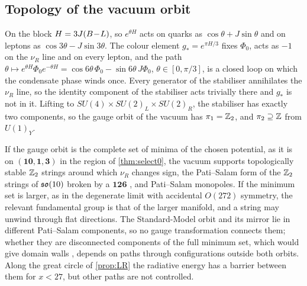 \subsection{Topology of the vacuum orbit}

\begin{theorem}[$\Z_2$ strings]
\label{thm:strings}
On the block $H=3J(B\!-\!L)$, so $e^{\theta H}$ acts on quarks as $\cos\theta+J\sin\theta$ and on leptons as $\cos3\theta-J\sin3\theta$. The colour element $g_*=e^{\pi H/3}$ fixes
$\Phi_0$, acts as $-1$ on the $\nu_R$ line and on every lepton, and the path $\theta\mapsto e^{\theta H}\Phi_0e^{-\theta H}=\cos6\theta\,\Phi_0-\sin6\theta\,J\Phi_0$,
$\theta\in[0,\pi/3]$, is a closed loop on which the condensate phase winds once. Every generator of the stabiliser annihilates the $\nu_R$ line, so the identity component
of the stabiliser acts trivially there and $g_*$ is not in it. Lifting to $SU(4)\times SU(2)_L\times SU(2)_R$, the stabiliser has exactly two components, so the gauge orbit of
the vacuum has $\pi_1=\mathbb{Z}_2$, and $\pi_2\supseteq\mathbb{Z}$ from $U(1)_Y$.
\end{theorem}

If the gauge orbit is the complete set of minima of the chosen potential, as it is on $(\mathbf{10},\mathbf1,\mathbf3)$ in the region of \cref{thm:select0}, the vacuum supports
topologically stable $\Z_2$ strings around which $\nu_R$ changes sign, the Pati--Salam form of the $\Z_2$ strings of $\mathfrak{so}(10)$ broken by a $\mathbf{126}$ \cite{KibbleLazaridesShafi82},
and Pati--Salam monopoles. If the minimum set is larger, as in the degenerate limit with accidental $O(272)$ symmetry, the relevant fundamental group is that of the
larger manifold, and a string may unwind through flat directions. The Standard-Model orbit and its mirror lie in different Pati--Salam components, so no gauge
transformation connects them; whether they are disconnected components of the full minimum set, which would give domain walls \cite{ZeldovichKobzarevOkun75},
depends on paths through configurations outside both orbits. Along the great circle of \cref{prop:LR} the radiative energy has a barrier between them for $x<27$,
but other paths are not controlled.

